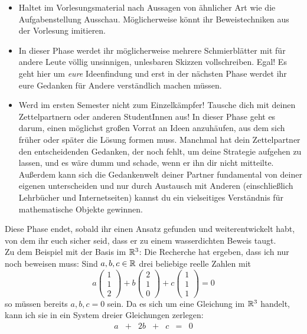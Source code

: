 \begin{phasetwo}[Rumprobieren]
\begin{itemize}
        \item Haltet im Vorlesungsmaterial nach Aussagen von ähnlicher Art wie die Aufgabenstellung Ausschau. Möglicherweise könnt ihr Beweistechniken aus der Vorlesung imitieren.
        \item In dieser Phase werdet ihr möglicherweise mehrere Schmierblätter mit für andere Leute völlig unsinnigen, unlesbaren Skizzen vollschreiben. Egal! Es geht hier um \emph{eure} Ideenfindung und erst in der nächsten Phase werdet ihr eure Gedanken für Andere verständlich machen müssen.
        \item Werd im ersten Semester nicht zum Einzelkämpfer! Tausche dich mit deinen Zettelpartnern oder anderen StudentInnen aus! In dieser Phase geht es darum, einen möglichst großen Vorrat an Ideen anzuhäufen, aus dem sich früher oder später die Lösung formen muss. Manchmal hat dein Zettelpartner den entscheidenden Gedanken, der noch fehlt, um deine Strategie aufgehen zu lassen, und es wäre dumm und schade, wenn er ihn dir nicht mitteilte. Außerdem kann sich die Gedankenwelt deiner Partner fundamental von deiner eigenen unterscheiden und nur durch Austausch mit Anderen (einschließlich Lehrbücher und Internetseiten) kannst du ein vielseitiges Verständnis für mathematische Objekte gewinnen.
    \end{itemize}
    Diese Phase endet, sobald ihr einen Ansatz gefunden und weiterentwickelt habt, von dem ihr euch sicher seid, dass er zu einem wasserdichten Beweis taugt. \\[0.5em]
    Zu dem Beispiel mit der Basis im $\mathbb R^3$: Die Recherche hat ergeben, dass ich nur noch beweisen muss: Sind $a,b,c\in \mathbb R$ drei beliebige reelle Zahlen mit
        \[ a\begin{pmatrix} 1 \\ 1 \\ 2 \end{pmatrix} + b \begin{pmatrix} 2 \\ 1 \\ 0 \end{pmatrix}+c \begin{pmatrix} 1 \\ 1 \\ 1 \end{pmatrix} = 0  \]
    so müssen bereits $a,b,c=0$ sein. Da es sich um eine Gleichung im $\mathbb R^3$ handelt, kann ich sie in ein System dreier Gleichungen zerlegen:
    \[\begin{array}{ccccccc}
        a &+& 2b &+& c &=& 0 \\

\end{array}\]
\end{phasetwo}
